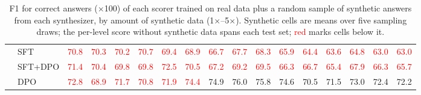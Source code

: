 \begin{table}[t]
\begin{tabular}{llccccccccccccccc}
 & SFT & \textcolor{red}{70.8} & \textcolor{red}{70.3} & \textcolor{red}{70.2} & \textcolor{red}{70.7} & \textcolor{red}{69.4} & \textcolor{red}{68.9} & \textcolor{red}{66.7} & \textcolor{red}{67.7} & \textcolor{red}{68.3} & \textcolor{red}{65.9} & \textcolor{red}{64.4} & \textcolor{red}{63.6} & \textcolor{red}{64.8} & \textcolor{red}{63.0} & \textcolor{red}{63.0} \\
 & SFT+DPO & \textcolor{red}{71.4} & \textcolor{red}{70.4} & \textcolor{red}{69.8} & \textcolor{red}{69.8} & \textcolor{red}{72.5} & \textcolor{red}{70.5} & \textcolor{red}{67.2} & \textcolor{red}{69.2} & \textcolor{red}{69.5} & \textcolor{red}{66.3} & \textcolor{red}{66.7} & \textcolor{red}{65.4} & \textcolor{red}{67.9} & \textcolor{red}{66.3} & \textcolor{red}{65.7} \\
 & DPO & \textcolor{red}{72.8} & \textcolor{red}{68.9} & \textcolor{red}{71.7} & \textcolor{red}{70.8} & \textcolor{red}{71.9} & \textcolor{red}{74.4} & 74.9 & 76.0 & 75.8 & 74.6 & 70.5 & 71.5 & 73.0 & 72.4 & 72.2 \\
\bottomrule
\end{tabular}
\caption{F1 for correct answers ($\times$100) of each scorer trained on real data plus a random sample of synthetic answers from each synthesizer, by amount of synthetic data (1$\times$--5$\times$). Synthetic cells are means over five sampling draws; the per-level score without synthetic data spans each test set; \textcolor{red}{red} marks cells below it.}
\label{tab:appendix-random-amount-level-2}
\end{table}

